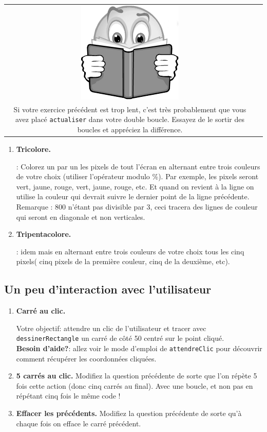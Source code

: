 \documentclass[11pt,a4paper]{article}
\newcommand{\checkbox}{$\square$ \smallskip}
\newenvironment{lecture}{%
\smallskip
\begin{tabular}{c|c}
    \hspace{.03\textwidth} \includegraphics[width=.07\textwidth]{img/lecture.jpg} & 
\begin{minipage}{.85\textwidth}
}{%
\end{minipage}
\end{tabular}
}
\newcounter{exo} \setcounter{exo}{0}
\newenvironment{action}{%
    \begin{enumerate}[\numerotation] \addtocounter{exo}{-1}%
        }{%
    \end{enumerate}
}
\newcommand{\numexoa}{\theexo \addtocounter{exo}{1}}
\newcommand{\numerotation}{\checkbox \smallskip \numexoa.}
\newcounter{exoo} \setcounter{exoo}{0}
\newcommand{\numexo}{\theexoo}
\newcommand{\repexo}{{\tt exo_\numexo}}
\newcommand{\exoplus}{\addtocounter{exoo}{1}}
\begin{document}
\begin{lecture}
{\bf Allez y mollo avec {\tt actualiser}}: cette fonction implique un rafraîchissement de tout l'écran, qui est assez coûteux en temps machine. Il est beaucoup plus rapide de n'actualiser qu'une fois toutes les modifications faites.\\
Si votre exercice précédent est trop lent, c'est très probablement que vous avez placé {\tt actualiser} dans votre double boucle. Essayez de le sortir des boucles et appréciez la différence.
\end{lecture}

\begin{action}
\item {\bf Tricolore.} \exoplus \repexo : Colorez un par un les pixels de tout l'écran en alternant entre trois couleurs de votre choix (utiliser l'opérateur modulo \%). Par exemple, les pixels seront vert, jaune, rouge, vert, jaune, rouge, etc. Et quand on revient à la ligne on utilise la couleur qui devrait suivre le dernier point de la ligne précédente. Remarque : 800 n'étant pas divisible par 3, ceci tracera des lignes de couleur qui seront en diagonale et non verticales.
\item {\bf Tripentacolore.} \exoplus \repexo : idem mais en alternant entre trois couleurs de votre choix tous les cinq pixels( cinq pixels de la première couleur, cinq de la deuxième, etc).
\end{action}

\subsection*{Un peu d'interaction avec l'utilisateur}
\begin{action}
\item {\bf Carré au clic.} \exoplus \repexo Votre objectif: attendre un clic de l'utilisateur et tracer avec {\tt dessinerRectangle} un carré de côté 50 centré sur le point cliqué. \\
{\bf Besoin d'aide?}: allez voir le mode d'emploi de {\tt attendreClic} pour découvrir comment récupérer les coordonnées cliquées.
\item {\bf 5 carrés au clic.} Modifiez la question précédente de sorte que l'on répète 5 fois cette action (donc cinq carrés au final). Avec une boucle, et non pas en répétant cinq fois le même code !
\item {\bf Effacer les précédents.} Modifiez la question précédente de sorte qu'à chaque fois on efface le carré précédent.
\end{action}
\end{document}
